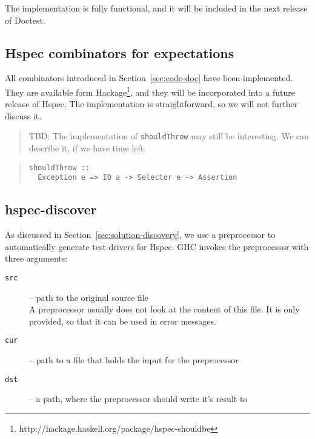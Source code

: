 \documentclass[preprint]{sigplanconf}
\begin{document}
The implementation is fully functional, and it will be included in the
next release of Doctest.


\subsection{Hspec combinators for expectations}
\label{sec:hspec-comb}

\noindent All combinators introduced in Section~\ref{sec:code-doc} have been
implemented.  They are available form Hackage\footnote{%
http://hackage.haskell.org/package/hspec-shouldbe},
and they will be incorporated into a future
release of Hspec.
The implementation is straightforward, so we will not further discuss
it.

\begin{quote}
    TBD: The implementation of \verb|shouldThrow| may still be
    interesting.  We can describe it, if we have time left.
\end{quote}

\begin{quote}
\small
\begin{verbatim}
shouldThrow ::
  Exception e => IO a -> Selector e -> Assertion
\end{verbatim}
\end{quote}

\subsection{hspec-discover}
\label{sec:implementation-discovery}

As discussed in Section~\ref{sec:solution-discovery}, we use a preprocessor to
automatically generate test drivers for Hspec.  GHC invokes the
preprocessor with three arguments:

\begin{description}
    \item[{\tt src}]
        -- path to the original source file\\
        A preprocessor usually does not
        look at the content of this file.  It is only provided, so
        that it can be used in error messages.
    \item[{\tt cur}]
        -- path to a file that holds the input for the preprocessor
    \item[{\tt dst}]
        -- a path, where the preprocessor should write it's result to
\end{description}
\end{document}
